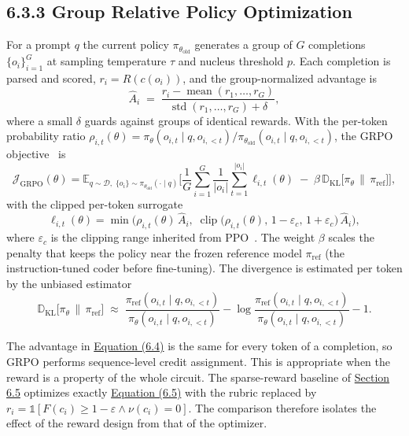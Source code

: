 \documentclass{report}
\theoremstyle{plain}
\theoremstyle{definition}
\theoremstyle{remark}
\newcommand{\eps}{\varepsilon}
\begin{document}
\subsection{6.3.3 Group Relative Policy Optimization}\label{sec:syn:grpo}

For a prompt $q$ the current policy $\pi_{\theta_{\mathrm{old}}}$ generates a group of $G$ completions $\{o_i\}_{i=1}^{G}$ at sampling temperature $\tau$ and nucleus threshold $p$. Each completion is parsed and scored, $r_i=R(c(o_i))$, and the group-normalized advantage is
\hypertarget{eq:syn:adv}{}\[
  \hat A_i \;=\; \frac{r_i-\operatorname{mean}(r_1,\dots,r_G)}{\operatorname{std}(r_1,\dots,r_G)+\delta},
\tag{6.4}\]
where a small $\delta$ guards against groups of identical rewards. With the per-token probability ratio $\rho_{i,t}(\theta)=\pi_\theta(o_{i,t}\mid q,o_{i,<t})/\pi_{\theta_{\mathrm{old}}}(o_{i,t}\mid q,o_{i,<t})$, the GRPO objective~\cite{shao2024deepseekmath} is
\hypertarget{eq:syn:grpo}{}\[
  \mathcal{J}_{\mathrm{GRPO}}(\theta)=
  \mathbb{E}_{q\sim\mathcal{D},\;\{o_i\}\sim\pi_{\theta_{\mathrm{old}}}(\cdot\mid q)}
  \Bigg[\frac{1}{G}\sum_{i=1}^{G}\frac{1}{|o_i|}\sum_{t=1}^{|o_i|}\ell_{i,t}(\theta)
  \;-\;\beta\, \mathbb{D}_{\mathrm{KL}}\big[\pi_\theta\,\big\|\,\pi_{\mathrm{ref}}\big]\Bigg],
\tag{6.5}\]
with the clipped per-token surrogate
\hypertarget{eq:syn:clip}{}\[
  \ell_{i,t}(\theta)=\min\!\Big(\rho_{i,t}(\theta)\,\hat A_i,\;
  \operatorname{clip}\big(\rho_{i,t}(\theta),\,1-\eps_{c},\,1+\eps_{c}\big)\,\hat A_i\Big),
\tag{6.6}\]
where $\eps_c$ is the clipping range inherited from PPO~\cite{schulman2017ppo}. The weight $\beta$ scales the penalty that keeps the policy near the frozen reference model $\pi_{\mathrm{ref}}$ (the instruction-tuned coder before fine-tuning). The divergence is estimated per token by the unbiased estimator
\hypertarget{eq:syn:kl}{}\[
  \mathbb{D}_{\mathrm{KL}}\big[\pi_\theta\,\big\|\,\pi_{\mathrm{ref}}\big]
  \;\approx\; \frac{\pi_{\mathrm{ref}}(o_{i,t}\mid q,o_{i,<t})}{\pi_\theta(o_{i,t}\mid q,o_{i,<t})}
  -\log\frac{\pi_{\mathrm{ref}}(o_{i,t}\mid q,o_{i,<t})}{\pi_\theta(o_{i,t}\mid q,o_{i,<t})}-1 .
\tag{6.7}\]

The advantage in \hyperref[eq:syn:adv]{Equation (6.4)} is the same for every token of a completion, so GRPO performs sequence-level credit assignment. This is appropriate when the reward is a property of the whole circuit. The sparse-reward baseline of \hyperref[sec:syn:results]{Section 6.5} optimizes exactly \hyperref[eq:syn:grpo]{Equation (6.5)} with the rubric replaced by $r_i=\mathbb{1}[F(c_i)\ge 1-\eps \wedge \nu(c_i)=0]$. The comparison therefore isolates the effect of the reward design from that of the optimizer.
\end{document}
